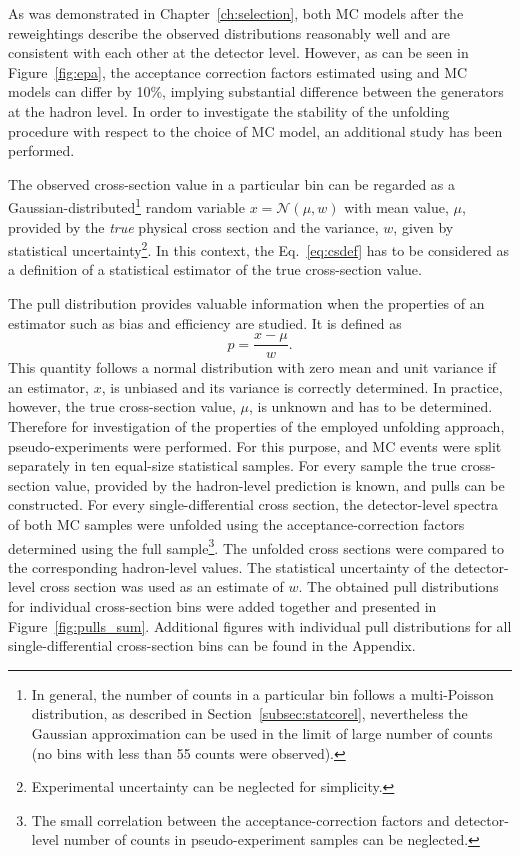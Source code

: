 As was demonstrated in Chapter~\ref{ch:selection}, both MC models after the reweightings describe the observed distributions reasonably well and are consistent with each other at the detector level. However, as can be seen in Figure~\ref{fig:epa}, the acceptance correction factors estimated using \ariadne and \lepto MC models can differ by 10\%, implying substantial difference between the generators at the hadron level. In order to investigate the stability of the unfolding procedure with respect to the choice of MC model, an additional study has been performed.

The observed cross-section value in a particular bin can be regarded as a Gaussian-distributed\footnote{In general, the number of counts in a particular bin follows a multi-Poisson distribution, as described in Section~\ref{subsec:statcorel}, nevertheless the Gaussian approximation can be used in the limit of large number of counts (no bins with less than 55 counts were observed).} random variable $x = \mathcal{N}\left(\mu,w\right)$ with mean value, $\mu$, provided by the \textit{true} physical cross section and the variance, $w$, given by statistical uncertainty\footnote{Experimental uncertainty can be neglected for simplicity.}. In this context, the Eq.~\eqref{eq:csdef} has to be considered as a definition of a statistical estimator of the true cross-section value.

The pull distribution provides valuable information when the properties of an estimator such as bias and efficiency are studied. It is defined as 
\begin{equation}
p=\frac{x-\mu}{w}.
\label{eq:pulldef}
\end{equation}
This quantity follows a normal distribution with zero mean and unit variance if an estimator, $x$, is unbiased and its variance is correctly determined. In practice, however, the true cross-section value, $\mu$, is unknown and has to be determined. Therefore for investigation of the properties of the employed unfolding approach, pseudo-experiments were performed. For this purpose, \lepto and \ariadne MC events were split separately in ten equal-size statistical samples. For every sample the true cross-section value, provided by the hadron-level prediction is known, and pulls can be constructed. For every single-differential cross section, the detector-level spectra of both MC samples were unfolded using the acceptance-correction factors determined using the full \lepto sample\footnote{The small correlation between the acceptance-correction factors and detector-level number of counts in \lepto pseudo-experiment samples can be neglected.}. The unfolded cross sections were compared to the corresponding hadron-level values. The statistical uncertainty of the detector-level cross section was used as an estimate of $w$. The obtained pull distributions for individual cross-section bins were added together and presented in Figure~\ref{fig:pulls_sum}. Additional figures with individual pull distributions for all single-differential cross-section bins can be found in the Appendix.

